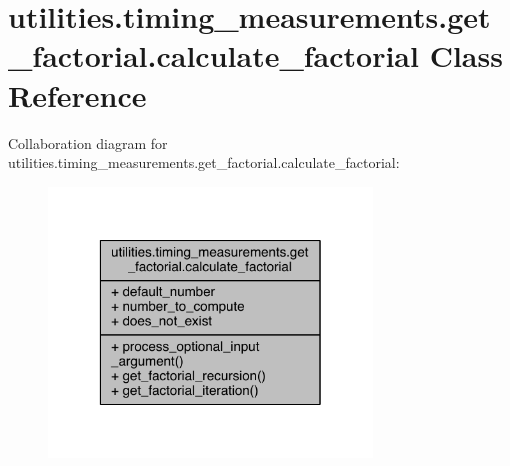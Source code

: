 \hypertarget{classutilities_1_1timing__measurements_1_1get__factorial_1_1calculate__factorial}{}\section{utilities.\+timing\+\_\+measurements.\+get\+\_\+factorial.\+calculate\+\_\+factorial Class Reference}
\label{classutilities_1_1timing__measurements_1_1get__factorial_1_1calculate__factorial}


Collaboration diagram for utilities.\+timing\+\_\+measurements.\+get\+\_\+factorial.\+calculate\+\_\+factorial\+:
\nopagebreak
\begin{figure}[H]
\begin{center}
\leavevmode
\includegraphics[width=244pt]{dd/d21/classutilities_1_1timing__measurements_1_1get__factorial_1_1calculate__factorial__coll__graph}
\end{center}
\end{figure}
